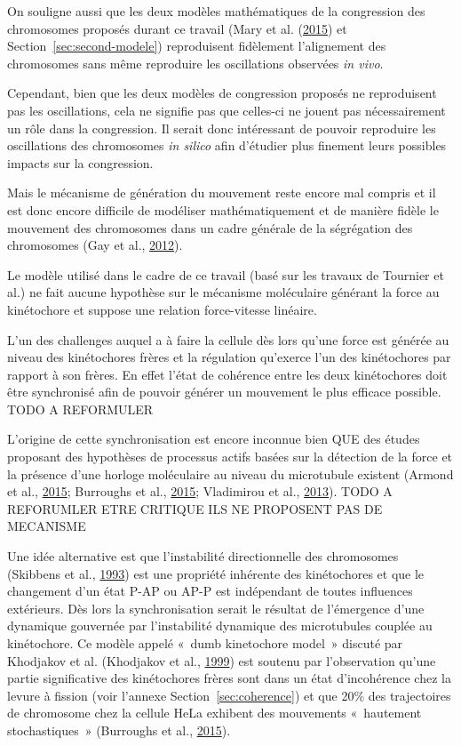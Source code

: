 \documentclass[12pt,a4paper,twoside,openright]{book}
\begin{document}
On souligne aussi que les deux modèles mathématiques de la congression
des chromosomes proposés durant ce travail (Mary et al.
(\protect\hyperlink{ref-Mary2015}{2015}) et
Section~\ref{sec:second-modele}) reproduisent fidèlement l'alignement
des chromosomes sans même reproduire les oscillations observées \emph{in
vivo}.

Cependant, bien que les deux modèles de congression proposés ne
reproduisent pas les oscillations, cela ne signifie pas que celles-ci ne
jouent pas nécessairement un rôle dans la congression. Il serait donc
intéressant de pouvoir reproduire les oscillations des chromosomes
\emph{in silico} afin d'étudier plus finement leurs possibles impacts
sur la congression.

Mais le mécanisme de génération du mouvement reste encore mal compris et
il est donc encore difficile de modéliser mathématiquement et de manière
fidèle le mouvement des chromosomes dans un cadre générale de la
ségrégation des chromosomes (Gay et al.,
\protect\hyperlink{ref-Gay2012a}{2012}).

Le modèle utilisé dans le cadre de ce travail (basé sur les travaux de
Tournier et al.) ne fait aucune hypothèse sur le mécanisme moléculaire
générant la force au kinétochore et suppose une relation force-vitesse
linéaire.

L'un des challenges auquel a à faire la cellule dès lors qu'une force
est générée au niveau des kinétochores frères et la régulation qu'exerce
l'un des kinétochores par rapport à son frères. En effet l'état de
cohérence entre les deux kinétochores doit être synchronisé afin de
pouvoir générer un mouvement le plus efficace possible. TODO A
REFORMULER

L'origine de cette synchronisation est encore inconnue bien QUE des
études proposant des hypothèses de processus actifs basées sur la
détection de la force et la présence d'une horloge moléculaire au niveau
du microtubule existent (Armond et al.,
\protect\hyperlink{ref-Armond2015}{2015}; Burroughs et al.,
\protect\hyperlink{ref-Burroughs2015}{2015}; Vladimirou et al.,
\protect\hyperlink{ref-Vladimirou2013}{2013}). TODO A REFORUMLER ETRE
CRITIQUE ILS NE PROPOSENT PAS DE MECANISME

Une idée alternative est que l'instabilité directionnelle des
chromosomes (Skibbens et al.,
\protect\hyperlink{ref-Skibbens1993}{1993}) est une propriété inhérente
des kinétochores et que le changement d'un état P-AP ou AP-P est
indépendant de toutes influences extérieurs. Dès lors la synchronisation
serait le résultat de l'émergence d'une dynamique gouvernée par
l'instabilité dynamique des microtubules couplée au kinétochore. Ce
modèle appelé «~dumb kinetochore model~» discuté par Khodjakov et al.
(Khodjakov et al., \protect\hyperlink{ref-Khodjakov1999}{1999}) est
soutenu par l'observation qu'une partie significative des kinétochores
frères sont dans un état d'incohérence chez la levure à fission (voir
l'annexe Section~\ref{sec:coherence}) et que 20\% des trajectoires de
chromosome chez la cellule HeLa exhibent des mouvements «~hautement
stochastiques~» (Burroughs et al.,
\protect\hyperlink{ref-Burroughs2015}{2015}).
\end{document}
